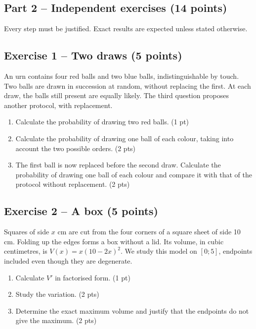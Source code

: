 \clearpage\subsection*{Part 2 -- Independent exercises (14 points)}
Every step must be justified. Exact results are expected unless stated otherwise.
\subsection*{Exercise 1 -- Two draws (5 points)}
An urn contains four red balls and two blue balls, indistinguishable by touch. Two balls are drawn in succession at random, without replacing the first. At each draw, the balls still present are equally likely. The third question proposes another protocol, with replacement.
\begin{enumerate}
\item Calculate the probability of drawing two red balls. \hfill(1 pt)
\item Calculate the probability of drawing one ball of each colour, taking into account the two possible orders. \hfill(2 pts)
\item The first ball is now replaced before the second draw. Calculate the probability of drawing one ball of each colour and compare it with that of the protocol without replacement. \hfill(2 pts)
\end{enumerate}
\subsection*{Exercise 2 -- A box (5 points)}
Squares of side $x$ cm are cut from the four corners of a square sheet of side 10 cm. Folding up the edges forms a box without a lid. Its volume, in cubic centimetres, is $V(x)=x(10-2x)^2$. We study this model on $[0;5]$, endpoints included even though they are degenerate.
\begin{enumerate}
\item Calculate $V\prime$ in factorised form. \hfill(1 pt)
\item Study the variation. \hfill(2 pts)
\item Determine the exact maximum volume and justify that the endpoints do not give the maximum. \hfill(2 pts)
\end{enumerate}
